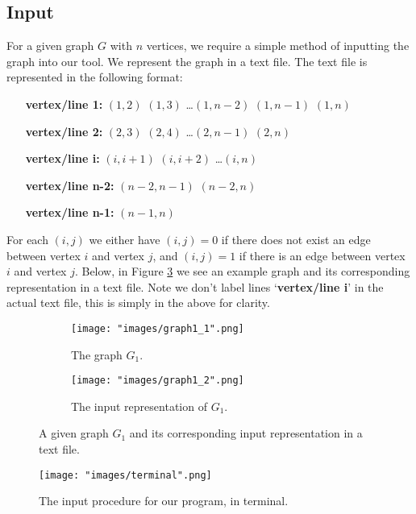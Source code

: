 \documentclass[12pt, a4paper]{article}
\begin{document}
\subsection*{Input}
For a given graph $G$ with $n$ vertices, we require a simple method of inputting the graph into our tool. We represent the graph in a text file. The text file is represented in the following format:
\begin{enumerate}[label=(\arabic*),leftmargin=6\parindent]
\itemsep0em
\item[\textbf{vertex/line 1:}]$(1, 2)$ $(1,3)$ \dots $(1,n-2)$ $(1,n-1)$ $(1, n)$
\item[\textbf{vertex/line 2:}] $(2, 3)$ $(2,4)$ \dots $(2,n-1)$ $(2, n)$
\item[\textbf{vertex/line i:}] $(i, i+1)$ $(i,i+2)$ \dots $(i, n)$
\item[\textbf{vertex/line n-2:}] $(n-2,n-1)$ $(n-2, n)$
\item[\textbf{vertex/line n-1:}] $(n-1,n)$
\end{enumerate}
For each $(i,j)$ we either have $(i, j) = 0$ if there does not exist an edge between vertex $i$ and vertex $j$, and $(i, j) = 1$ if there is an edge between vertex $i$ and vertex $j$. Below, in Figure \ref{fig:fig1} we see an example graph and its corresponding representation in a text file. Note we don't label lines `\textbf{vertex/line i}' in the actual text file, this is simply in the above for clarity.

\begin{figure}[!htb]
\centering
\begin{subfigure}{.5\textwidth}
  \centering
  \texttt{[image: "images/graph1\_1".png]}
  \caption*{The graph $G_1$.}
  \label{fig:sub1}
\end{subfigure}%
\begin{subfigure}{.5\textwidth}
  \centering
  \texttt{[image: "images/graph1\_2".png]}
  \caption*{The input representation of $G_1$. }
  \label{fig:sub2}
\end{subfigure}
\caption{A given graph $G_1$ and its corresponding input representation in a text file.}
\label{fig:fig1}
\end{figure}



\begin{figure}
\centering
\texttt{[image: "images/terminal".png]}
\caption{The input procedure for our program, in terminal.}
\label{fig:fig2}
\end{figure}
\end{document}
